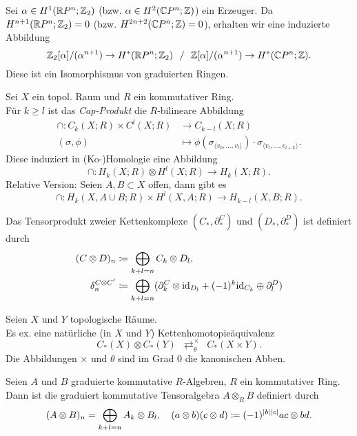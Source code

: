 \documentclass{cheat-sheet}
\newcommand{\angles}[1]{{\langle #1 \rangle}}
\newcommand{\ZM}[1]{\Z_{#1}} %
\begin{document}
\begin{satz}
  Sei $\alpha \in H^1(\R P^n; \ZM{2})$ (bzw. $\alpha \in H^2(\mathbb{C} P^n; \mathbb{Z})$) ein Erzeuger. Da $H^{n+1}(\R P^n; \ZM{2}) = 0$ (bzw. $H^{2n+2}(\mathbb{C} P^n; \mathbb{Z}) = 0$), erhalten wir eine induzierte Abbildung
  \[
    \ZM{2}[\alpha]/(\alpha^{n+1}) \to H^*(\R P^n; \ZM{2})
    \enspace \,/\, \enspace
    \Z[\alpha]/(\alpha^{n+1}) \to H^*(\C P^n; \Z).
  \]
  Diese ist ein Isomorphismus von graduierten Ringen.
\end{satz}

\begin{defn}
  Sei $X$ ein topol. Raum und $R$ ein kommutativer Ring. \\
  Für $k \geq l$ ist das \emph{Cap-Produkt} die $R$-bilineare Abbildung
  \begin{align*}
    \cap : C_k(X; R) \times C^l(X; R) & \to C_{k-l}(X; R) \\
    (\sigma, \phi) & \mapsto \phi(\sigma_\angles{v_0, \ldots, v_l}) \cdot \sigma_\angles{v_l, \ldots, v_{l+k}}.
  \end{align*}
  Diese induziert in (Ko-)Homologie eine Abbildung
  \[ \cap : H_k(X; R) \otimes H^l(X; R) \to H_k(X; R). \]
  Relative Version: Seien $A, B \subset X$ offen, dann gibt es
  \[ \cap : H_k(X, A \cup B; R) \times H^l(X, A; R) \to H_{k-l}(X, B; R). \]
\end{defn}

\begin{defn}
  Das Tensorprodukt zweier Kettenkomplexe $(C_*, \partial^C_*)$ und $(D_*, \partial^D_*)$ ist definiert durch
  \begin{align*}
    (C \otimes D)_n & \coloneqq \bigoplus_{k+l=n} C_k \otimes D_l, \\
    \delta^{C \otimes C'}_n & \coloneqq \bigoplus_{k+l=n} (\partial^C_k \otimes \mathrm{id}_{D_l} + (-1)^k \mathrm{id}_{C_k} \oplus \partial^D_l)
  \end{align*}
\end{defn}

\begin{satz}
  Seien $X$ und $Y$ topologische Räume. \\
  Es ex. eine natürliche (in $X$ und $Y$) Kettenhomotopieäquivalenz
  \[ C_*(X) \otimes C_*(Y) \enspace \mathop{\rightleftarrows}^\times_\theta \enspace C_*(X \times Y). \]
  Die Abbildungen $\times$ und $\theta$ sind im Grad $0$ die kanonischen Abben.
\end{satz}

\begin{defn}
  Seien $A$ und $B$ graduierte kommutative $R$-Algebren, $R$ ein kommutativer Ring. Dann ist die graduiert kommutative Tensoralgebra $A \otimes_R B$ definiert durch
  \[
    (A \otimes B)_n = \bigoplus_{k+l=n} A_k \otimes B_l, \quad
    (a \otimes b)(c \otimes d) \coloneqq (-1)^{\lvert b\rvert \lvert c\rvert} ac \otimes bd.
  \]
\end{defn}
\end{document}
